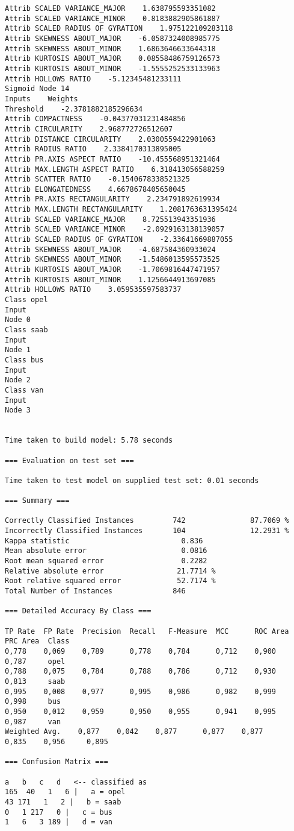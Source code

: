 \documentclass[
	article,			%
	11pt,				%
	oneside,			%
	a4paper,			%
	english,			%
	brazil,				%
	sumario=tradicional
	]{abntex2}
\begin{document}
\begin{lstlisting}
Attrib SCALED VARIANCE_MAJOR    1.638795593351082
Attrib SCALED VARIANCE_MINOR    0.8183882905861887
Attrib SCALED RADIUS OF GYRATION    1.975122109283118
Attrib SKEWNESS ABOUT_MAJOR    -6.0587324008985775
Attrib SKEWNESS ABOUT_MINOR    1.6863646633644318
Attrib KURTOSIS ABOUT_MAJOR    0.08558486759126573
Attrib KURTOSIS ABOUT_MINOR    -1.5555252533133963
Attrib HOLLOWS RATIO    -5.12345481233111
Sigmoid Node 14
Inputs    Weights
Threshold    -2.3781882185296634
Attrib COMPACTNESS    -0.04377031231484856
Attrib CIRCULARITY    2.968772726512607
Attrib DISTANCE CIRCULARITY    2.0300559422901063
Attrib RADIUS RATIO    2.3384170313895005
Attrib PR.AXIS ASPECT RATIO    -10.455568951321464
Attrib MAX.LENGTH ASPECT RATIO    6.318413056588259
Attrib SCATTER RATIO    -0.1540678338521325
Attrib ELONGATEDNESS    4.6678678405650045
Attrib PR.AXIS RECTANGULARITY    2.234791892619934
Attrib MAX.LENGTH RECTANGULARITY    1.2081763631395424
Attrib SCALED VARIANCE_MAJOR    8.725513943351936
Attrib SCALED VARIANCE_MINOR    -2.0929163138139057
Attrib SCALED RADIUS OF GYRATION    -2.33641669887055
Attrib SKEWNESS ABOUT_MAJOR    -4.687584360933024
Attrib SKEWNESS ABOUT_MINOR    -1.5486013595573525
Attrib KURTOSIS ABOUT_MAJOR    -1.7069816447471957
Attrib KURTOSIS ABOUT_MINOR    1.1256644913697085
Attrib HOLLOWS RATIO    3.059535597583737
Class opel
Input
Node 0
Class saab
Input
Node 1
Class bus
Input
Node 2
Class van
Input
Node 3


Time taken to build model: 5.78 seconds

=== Evaluation on test set ===

Time taken to test model on supplied test set: 0.01 seconds

=== Summary ===

Correctly Classified Instances         742               87.7069 %
Incorrectly Classified Instances       104               12.2931 %
Kappa statistic                          0.836 
Mean absolute error                      0.0816
Root mean squared error                  0.2282
Relative absolute error                 21.7714 %
Root relative squared error             52.7174 %
Total Number of Instances              846     

=== Detailed Accuracy By Class ===

TP Rate  FP Rate  Precision  Recall   F-Measure  MCC      ROC Area  PRC Area  Class
0,778    0,069    0,789      0,778    0,784      0,712    0,900     0,787     opel
0,788    0,075    0,784      0,788    0,786      0,712    0,930     0,813     saab
0,995    0,008    0,977      0,995    0,986      0,982    0,999     0,998     bus
0,950    0,012    0,959      0,950    0,955      0,941    0,995     0,987     van
Weighted Avg.    0,877    0,042    0,877      0,877    0,877      0,835    0,956     0,895     

=== Confusion Matrix ===

a   b   c   d   <-- classified as
165  40   1   6 |   a = opel
43 171   1   2 |   b = saab
0   1 217   0 |   c = bus
1   6   3 189 |   d = van

\end{lstlisting}
\end{document}
